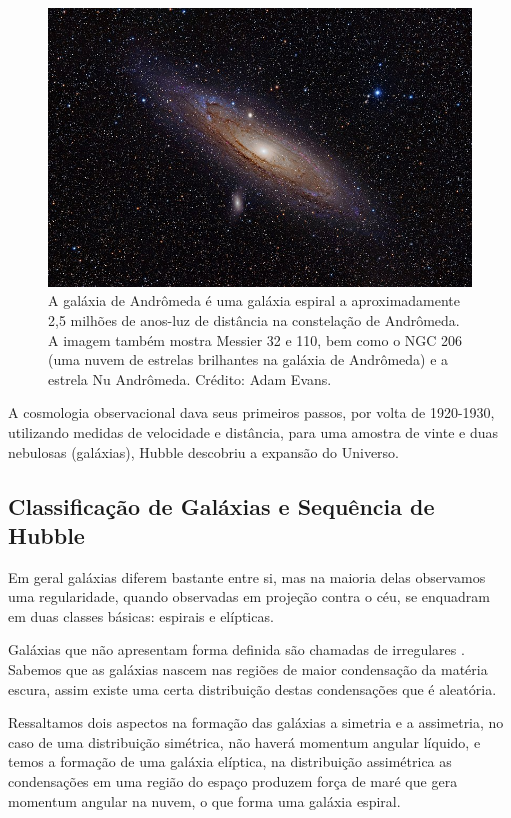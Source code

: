 \begin{figure}[ht!] 
\centering 
\includegraphics[width=14cm]{imagens/800px-Andromeda_Galaxy_(with_h-alpha).jpg} 
\caption{A galáxia de Andrômeda é uma galáxia espiral a aproximadamente 2,5 milhões de anos-luz de distância na constelação de Andrômeda. A imagem também mostra Messier 32 e 110, bem como o NGC 206 (uma nuvem de estrelas brilhantes na galáxia de Andrômeda) e a estrela Nu Andrômeda. Crédito: Adam Evans.} 
\label{fig:Andrômeda} 
\end{figure} 

A cosmologia observacional dava seus primeiros passos, por volta de 1920-1930, utilizando medidas de velocidade e distância, para uma amostra de vinte e duas nebulosas (galáxias), Hubble descobriu a expansão do Universo. 

\subsection{Classificação de Galáxias e Sequência de Hubble} 

Em geral galáxias diferem bastante entre si, mas na maioria delas observamos uma regularidade, quando observadas em projeção contra o céu, se enquadram em duas classes básicas: espirais e elípticas.  

Galáxias que não apresentam forma definida são chamadas de irregulares \cite{extragalatic}. Sabemos que as galáxias nascem nas regiões de maior condensação da matéria escura, assim existe uma certa distribuição destas condensações que é aleatória.  

Ressaltamos dois aspectos na formação das galáxias a simetria e a assimetria, no caso de uma distribuição simétrica, não haverá momentum angular líquido, e temos a formação de uma galáxia elíptica, na distribuição assimétrica as condensações em uma região do espaço produzem força de maré que gera momentum angular na nuvem, o que forma uma galáxia espiral. 

